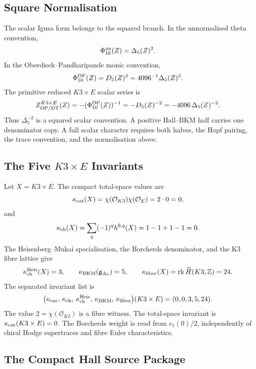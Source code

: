 \subsection{Square Normalisation}
\label{subsec:delta5-square-normalisation}

The scalar Igusa form belongs to the squared branch.  In the
unnormalised theta convention,
\[
  \Phi_{10}^{\mathrm{un}}(Z)=\Delta_5(Z)^2.
\]
In the Oberdieck--Pandharipande monic convention,
\[
  \Phi_{10}^{\mathrm{OP}}(Z)
  =
  D_5(Z)^2
  =
  4096^{-1}\Delta_5(Z)^2.
\]
The primitive reduced \(K3\times E\) scalar series is
\[
  Z^{K3\times E}_{\mathrm{OP/DT}}(Z)
  =
  -(\Phi_{10}^{\mathrm{OP}}(Z))^{-1}
  =
  -D_5(Z)^{-2}
  =
  -4096\,\Delta_5(Z)^{-2}.
\]
Thus \(\Delta_5^{-2}\) is a squared scalar convention.  A positive
Hall--BKM half carries one denominator copy.  A full scalar character
requires both halves, the Hopf pairing, the trace convention, and the
normalisation above.

\subsection{The Five \texorpdfstring{$K3\times E$}{K3 x E} Invariants}
\label{subsec:k3e-five-invariants-delta5}

Let \(X=K3\times E\).  The compact total-space values are
\[
  \kappa_{\mathrm{cat}}(X)
  =
  \chi(\mathcal O_{K3})\chi(\mathcal O_E)
  =
  2\cdot0
  =
  0,
\]
and
\[
  \kappa_{\mathrm{ch}}(X)
  =
  \sum_q(-1)^q h^{0,q}(X)
  =
  1-1+1-1
  =
  0.
\]
The Heisenberg--Mukai specialisation, the Borcherds denominator, and
the K3 fibre lattice give
\[
  \kappa_{\mathrm{ch}}^{\mathrm{Heis}}(X)=3,\qquad
  \kappa_{\mathrm{BKM}}(\mathfrak g_{\Delta_5})=5,\qquad
  \kappa_{\mathrm{fiber}}(X)=\operatorname{rk}\widetilde H(K3,\mathbb Z)=24.
\]
The separated invariant list is
\[
  \bigl(
  \kappa_{\mathrm{cat}},\,
  \kappa_{\mathrm{ch}},\,
  \kappa_{\mathrm{ch}}^{\mathrm{Heis}},\,
  \kappa_{\mathrm{BKM}},\,
  \kappa_{\mathrm{fiber}}
  \bigr)(K3\times E)
  =
  (0,0,3,5,24).
\]
The value \(2=\chi(\mathcal O_{K3})\) is a fibre witness.  The
total-space invariant is \(\kappa_{\mathrm{cat}}(K3\times E)=0\).  The Borcherds
weight is read from \(c_1(0)/2\), independently of chiral Hodge
supertraces and fibre Euler characteristics.

\subsection{The Compact Hall Source Package}
\label{subsec:compact-hall-source-package-hdelta}

